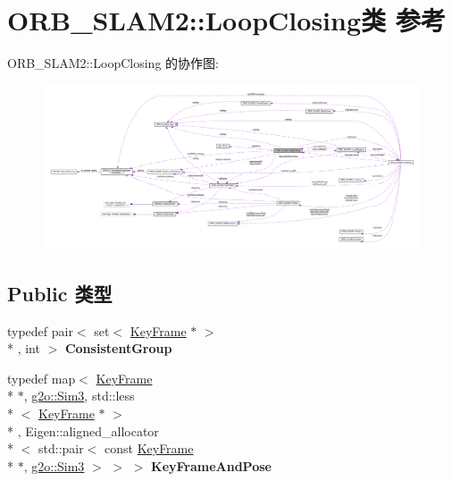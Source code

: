 \hypertarget{classORB__SLAM2_1_1LoopClosing}{\section{O\-R\-B\-\_\-\-S\-L\-A\-M2\-:\-:Loop\-Closing类 参考}
\label{classORB__SLAM2_1_1LoopClosing}
}


O\-R\-B\-\_\-\-S\-L\-A\-M2\-:\-:Loop\-Closing 的协作图\-:
\nopagebreak
\begin{figure}[H]
\begin{center}
\leavevmode
\includegraphics[width=350pt]{classORB__SLAM2_1_1LoopClosing__coll__graph}
\end{center}
\end{figure}
\subsection*{Public 类型}
\begin{DoxyCompactItemize}
\item 
\hypertarget{classORB__SLAM2_1_1LoopClosing_a8efed418be885643d3c43113ff1d7bb2}{typedef pair$<$ set$<$ \hyperlink{classORB__SLAM2_1_1KeyFrame}{Key\-Frame} $\ast$ $>$\\*
, int $>$ {\bfseries Consistent\-Group}}\label{classORB__SLAM2_1_1LoopClosing_a8efed418be885643d3c43113ff1d7bb2}

\item 
\hypertarget{classORB__SLAM2_1_1LoopClosing_ae9ada143a8308ce32990a7c7b5d533ab}{typedef map$<$ \hyperlink{classORB__SLAM2_1_1KeyFrame}{Key\-Frame} \\*
$\ast$, \hyperlink{structg2o_1_1Sim3}{g2o\-::\-Sim3}, std\-::less\\*
$<$ \hyperlink{classORB__SLAM2_1_1KeyFrame}{Key\-Frame} $\ast$ $>$\\*
, Eigen\-::aligned\-\_\-allocator\\*
$<$ std\-::pair$<$ const \hyperlink{classORB__SLAM2_1_1KeyFrame}{Key\-Frame} \\*
$\ast$, \hyperlink{structg2o_1_1Sim3}{g2o\-::\-Sim3} $>$ $>$ $>$ {\bfseries Key\-Frame\-And\-Pose}}\label{classORB__SLAM2_1_1LoopClosing_ae9ada143a8308ce32990a7c7b5d533ab}

\end{DoxyCompactItemize}

